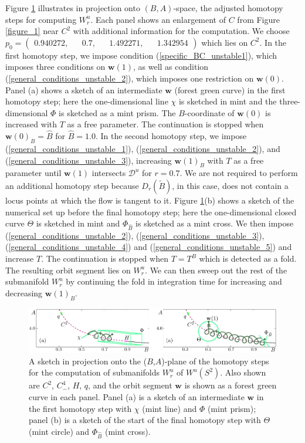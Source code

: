 \documentclass{ws-ijbc}
\begin{document}
Figure \ref{figure_7} illustrates in projection onto $(B,A)$-space, the adjusted homotopy steps for computing $W^u_r$.  Each panel shows an enlargement of $C$ from Figure \ref{figure_1} near $C^2$ with additional information for the computation.   We choose $p_0=\begin{pmatrix} 0.940272, && 0.7, && 1.492271, && 1.342954 \end{pmatrix}$ which lies on $C^2$.  In the first homotopy step, we impose condition (\ref{specific_BC_unstable1}), which imposes three conditions on $\mathbf{w}(1)$, as well as condition (\ref{general_conditions_unstable_2}), which imposes one restriction on $\mathbf{w}(0)$.  Panel (a) shows a sketch of an intermediate $\mathbf{w}$ (forest green curve) in the first homotopy step; here the one-dimensional line $\chi$ is sketched in mint and the three-dimensional $\Phi$ is sketched as a mint prism.  The $B$-coordinate of $\mathbf{w}(0)$ is increased with $T$ as a free parameter.  The continuation is stopped when $\mathbf{w}(0)_B=\widehat{B}$ for $\widehat{B}=1.0$.  In the second homotopy step, we impose (\ref{general_conditions_unstable_1}), (\ref{general_conditions_unstable_2}), and (\ref{general_conditions_unstable_3}), increasing $\mathbf{w}(1)_B$ with $T$ as a free parameter until $\mathbf{w}(1)$ intersects $\mathscr{D}^u$ for $r=0.7$.  We are not required to perform an additional homotopy step because $D_r(\widetilde{B})$, in this case, does not contain a locus points at which the flow is tangent to it.  Figure \ref{figure_7}(b) shows a sketch of the numerical set up before the final homotopy step; here the one-dimensional closed curve $\Theta$ is sketched in mint and $\Phi_{\widehat{B}}$ is sketched as a mint cross. We then impose (\ref{general_conditions_unstable_2}), (\ref{general_conditions_unstable_3}), (\ref{general_conditions_unstable_4}) and (\ref{general_conditions_unstable_5}) and increase $T$.  The continuation is stopped when $T=T^B$ which is detected as a fold.  The resulting orbit segment lies on $W^u_r$.  We can then sweep out the rest of the submanifold $W^u_r$ by continuing the fold in integration time for increasing and decreasing $\mathbf{w}(1)_B$.

\begin{figure}[H]
\centering
\includegraphics[]{./figures/MKMO_7.pdf}
\caption{A sketch in projection onto the ($B$,$A$)-plane of the homotopy steps for the computation of submanifolds $W^u_r$ of $W^u(S^2)$.  Also shown are $C^2$, $C^4_-$, $H$, $q$, and the orbit segment $\mathbf{w}$ is shown as a forest green curve in each panel.  Panel (a) is a sketch of an intermediate $\mathbf{w}$ in the first homotopy step with $\chi$ (mint line) and $\Phi$ (mint prism); panel (b) is a sketch of the start of the final homotopy step with $\Theta$ (mint circle) and $\Phi_{\widehat{B}}$ (mint cross).}
\label{figure_7}
\end{figure} 
\end{document}
